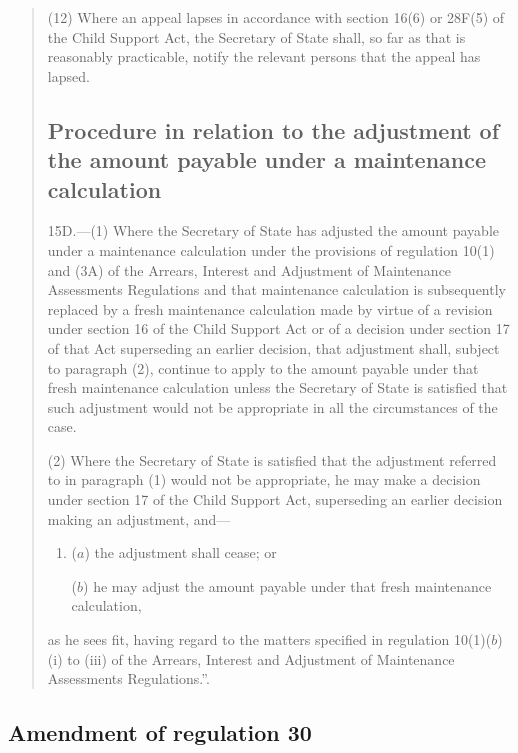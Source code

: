 \documentclass[12pt,a4paper]{article}
\begin{document}
\begin{quotation}
(12) Where an appeal lapses in accordance with section 16(6) or 28F(5) of the Child Support Act, the Secretary of State shall, so far as that is reasonably practicable, notify the relevant persons that the appeal has lapsed.

\subsection*{\sloppy Procedure in relation to the adjustment of the amount payable under a maintenance calculation}

15D.---(1)  Where the Secretary of State has adjusted the amount payable under a maintenance calculation under the provisions of regulation 10(1) and (3A) of the Arrears, Interest and Adjustment of Maintenance Assessments Regulations and that maintenance calculation is subsequently replaced by a fresh maintenance calculation made by virtue of a revision under section 16 of the Child Support Act or of a decision under section 17 of that Act superseding an earlier decision, that adjustment shall, subject to paragraph (2), continue to apply to the amount payable under that fresh maintenance calculation unless the Secretary of State is satisfied that such adjustment would not be appropriate in all the circumstances of the case.

(2) Where the Secretary of State is satisfied that the adjustment referred to in paragraph (1) would not be appropriate, he may make a decision under section 17 of the Child Support Act, superseding an earlier decision making an adjustment, and—
\begin{enumerate}\item[]
($a$) the adjustment shall cease; or

($b$) he may adjust the amount payable under that fresh maintenance calculation,
\end{enumerate}
as he sees fit, having regard to the matters specified in regulation 10(1)($b$)(i)  to (iii)  of the Arrears, Interest and Adjustment of Maintenance Assessments Regulations.”.
\end{quotation}

\subsection[11. Amendment of regulation 30]{Amendment of regulation 30}
\end{document}
